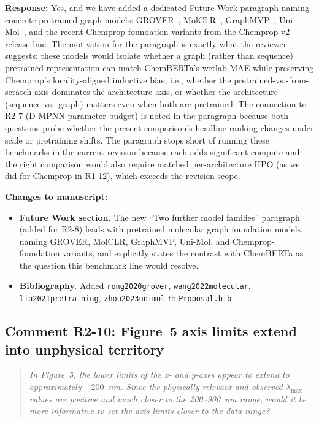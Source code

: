 \documentclass[11pt]{article}
\newenvironment{reviewer}{%
  \begin{quote}\itshape\color{black!70}}{%
  \end{quote}}
\newcommand{\response}[1]{\noindent\textbf{Response:} #1\par\medskip}
\newenvironment{changes}{%
  \noindent\textbf{Changes to manuscript:}
  \begin{itemize}[leftmargin=2em,itemsep=2pt]}{%
  \end{itemize}\medskip}
\begin{document}
\response{Yes, and we have added a dedicated Future Work paragraph naming concrete pretrained graph models: GROVER~\cite{rong2020grover}, MolCLR~\cite{wang2022molecular}, GraphMVP~\cite{liu2021pretraining}, Uni-Mol~\cite{zhou2023unimol}, and the recent Chemprop-foundation variants from the Chemprop v2 release line. The motivation for the paragraph is exactly what the reviewer suggests: these models would isolate whether a graph (rather than sequence) pretrained representation can match ChemBERTa's wetlab MAE while preserving Chemprop's locality-aligned inductive bias, i.e., whether the pretrained-vs.-from-scratch axis dominates the architecture axis, or whether the architecture (sequence vs.\ graph) matters even when both are pretrained. The connection to R2-7 (D-MPNN parameter budget) is noted in the paragraph because both questions probe whether the present comparison's headline ranking changes under scale or pretraining shifts. The paragraph stops short of running these benchmarks in the current revision because each adds significant compute and the right comparison would also require matched per-architecture HPO (as we did for Chemprop in R1-12), which exceeds the revision scope.}

\begin{changes}
  \item \textbf{Future Work section.} The new ``Two further model families'' paragraph (added for R2-8) leads with pretrained molecular graph foundation models, naming GROVER, MolCLR, GraphMVP, Uni-Mol, and Chemprop-foundation variants, and explicitly states the contrast with ChemBERTa as the question this benchmark line would resolve.
  \item \textbf{Bibliography.} Added \texttt{rong2020grover}, \texttt{wang2022molecular}, \texttt{liu2021pretraining}, \texttt{zhou2023unimol} to \texttt{Proposal.bib}.
\end{changes}

\subsection*{Comment R2-10: Figure~5 axis limits extend into unphysical territory}
\begin{reviewer}
In Figure~5, the lower limits of the x- and y-axes appear to extend to approximately $-200$~nm. Since the physically relevant and observed $\lambda_{\max}$ values are positive and much closer to the 200--900~nm range, would it be more informative to set the axis limits closer to the data range?
\end{reviewer}
\end{document}
